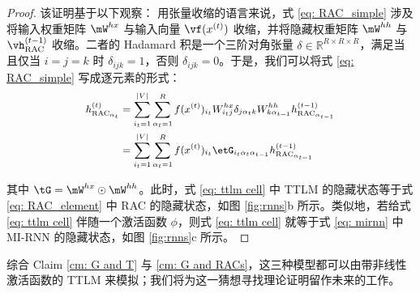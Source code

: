 \documentclass{article}
\theoremstyle{plain}
\theoremstyle{definition}
\theoremstyle{remark}
\begin{document}
\begin{proof} 该证明基于以下观察：
%
用张量收缩的语言来说，式 \ref{eq: RAC_simple} 涉及将输入权重矩阵 $\mW^{hx}$ 与输入向量 $\vf (x^{(t)})$ 收缩，并将隐藏权重矩阵 $\mW^{hh}$ 与 $\vh^{(t-1)}_\textrm{RAC}$ 收缩。二者的 Hadamard 积是一个三阶对角张量 $\delta \in \mathbb{R}^{R \times R \times R}$，满足当且仅当 $i = j = k$ 时 $\delta_{ijk} = 1$，否则 $\delta_{ijk} = 0$。于是，我们可以将式 \ref{eq: RAC_simple} 写成逐元素的形式：
%
\begin{equation} \small
\begin{split}
    \label{eq: RAC_element}
    h^{(t)}_{\textrm{RAC}_{\alpha_t}}
    & = \sum_{{i_t = 1}}^{|V|} \sum_{{\alpha_t = 1}}^{R} f(x^{(t)})_{i_t}W^{hx}_{i_tj}\mathbf{\delta}_{j\alpha_{t}k}W^{hh}_{k\alpha_{t-1}} h^{(t-1)}_{\textrm{RAC}_{\alpha_{t-1}}} \\
    & = \sum_{{i_t = 1}}^{|V|} \sum_{{\alpha_t = 1}}^{R} f(x^{(t)})_{i_t}\etG_{i_t\alpha_{t}\alpha_{t-1}} h^{(t-1)}_{\textrm{RAC}_{\alpha_{t-1}}} \\
\end{split}
\end{equation}


其中 $\tG = \mW^{hx} \odot \mW^{hh}$。此时，式 \ref{eq: ttlm cell} 中 TTLM 的隐藏状态等于式 \ref{eq: RAC_element} 中 RAC 的隐藏状态，如图 \ref{fig:rnns}b 所示。类似地，若给式 \ref{eq: ttlm cell} 伴随一个激活函数 $\phi$，则式 \ref{eq: ttlm cell} 就等于式 \ref{eq: mirnn} 中 MI-RNN 的隐藏状态，如图 \ref{fig:rnns}c 所示。

\end{proof}

综合 Claim \ref{cm: G and T} 与 \ref{cm: G and RACs}，这三种模型都可以由带非线性激活函数的 TTLM 来模拟；我们将为这一猜想寻找理论证明留作未来的工作。



\end{document}

